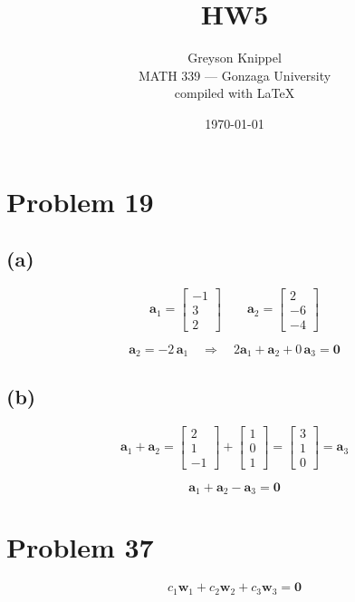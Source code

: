 \documentclass{article}
\title{HW5}
\author{
Greyson Knippel \\[4pt]
MATH 339 --- Gonzaga University \\[4pt]
compiled with \LaTeX{}
}
\date{\today}
\begin{document}
\maketitle

\section*{Problem 19}

\subsection*{(a)}

\[
\mathbf{a}_1 = \begin{bmatrix} -1 \\ 3 \\ 2 \end{bmatrix}
\qquad
\mathbf{a}_2 = \begin{bmatrix} 2 \\ -6 \\ -4 \end{bmatrix}
\]

\[
\mathbf{a}_2 = -2\,\mathbf{a}_1
\quad\Longrightarrow\quad
2\mathbf{a}_1 + \mathbf{a}_2 + 0\,\mathbf{a}_3 = \mathbf{0}
\]

\subsection*{(b)}

\[
\mathbf{a}_1 + \mathbf{a}_2 =
\begin{bmatrix} 2 \\ 1 \\ -1 \end{bmatrix} +
\begin{bmatrix} 1 \\ 0 \\ 1 \end{bmatrix} =
\begin{bmatrix} 3 \\ 1 \\ 0 \end{bmatrix} = \mathbf{a}_3
\]

\[
\mathbf{a}_1 + \mathbf{a}_2 - \mathbf{a}_3 = \mathbf{0}
\]

\section*{Problem 37}

\[
c_1\mathbf{w}_1 + c_2\mathbf{w}_2 + c_3\mathbf{w}_3 = \mathbf{0}
\]
\end{document}
